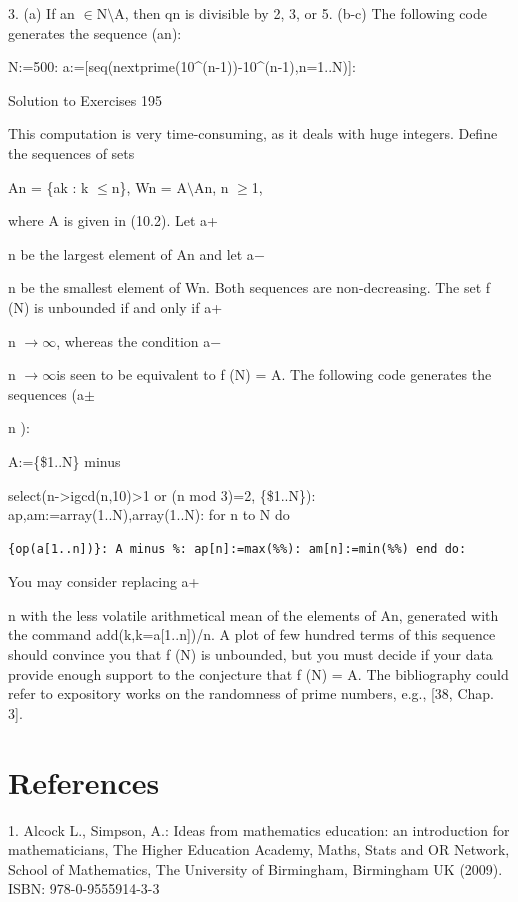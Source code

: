 \documentclass[11pt]{article}
\theoremstyle{plain}
\theoremstyle{definition}
\begin{document}
3. (a) If an $\in$N$\setminus$A, then qn is divisible by 2, 3, or 5. (b-c) The following code generates the sequence (an):

N:=500: a:=[seq(nextprime(10\^{}(n-1))-10\^{}(n-1),n=1..N)]:

Solution to Exercises 195

This computation is very time-consuming, as it deals with huge integers. Define the sequences of sets

An = \{ak : k $\leq$n\}, Wn = A$\setminus$An, n $\geq$1,

where A is given in (10.2). Let a+

n be the largest element of An and let a$-$

n be the smallest element of Wn. Both sequences are non-decreasing. The set f (N) is unbounded if and only if a+

n $\to$$\infty$, whereas the condition a$-$

n $\to$$\infty$is seen to be equivalent to f (N) = A. The following code generates the sequences (a$\pm$

n ):

A:=\{\$1..N\} minus

select(n->igcd(n,10)>1 or (n mod 3)=2, \{\$1..N\}): ap,am:=array(1..N),array(1..N): for n to N do

\begin{lstlisting}
{op(a[1..n])}: A minus %: ap[n]:=max(%%): am[n]:=min(%%) end do:
\end{lstlisting}

You may consider replacing a+

n with the less volatile arithmetical mean of the elements of An, generated with the command add(k,k=a[1..n])/n. A plot of few hundred terms of this sequence should convince you that f (N) is unbounded, but you must decide if your data provide enough support to the conjecture that f (N) = A. The bibliography could refer to expository works on the randomness of prime numbers, e.g., [38, Chap. 3].

\section{References}

1. Alcock L., Simpson, A.: Ideas from mathematics education: an introduction for mathematicians, The Higher Education Academy, Maths, Stats and OR Network, School of Mathematics, The University of Birmingham, Birmingham UK (2009). ISBN: 978-0-9555914-3-3
\end{document}
